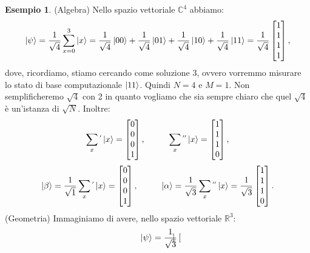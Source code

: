 \documentclass{book}
\theoremstyle{definition}
\theoremstyle{definition}
\theoremstyle{definition}
\newtheorem*{ex}{Esempio}
\theoremstyle{plain}
\theoremstyle{plain}
\theoremstyle{plain}
\theoremstyle{plain}
\begin{document}
\begin{ex}
(Algebra) Nello spazio vettoriale $\mathbb{C}^{4}$ abbiamo:
\begin{displaymath}
\ket{\psi} = \frac{1}{\sqrt{4}}\sum_{x=0}^{3}\ket{x} = \frac{1}{\sqrt{4}}\ket{00} + \frac{1}{\sqrt{4}}\ket{01} + \frac{1}{\sqrt{4}}\ket{10} + \frac{1}{\sqrt{4}}\ket{11} = \frac{1}{\sqrt{4}} \begin{bmatrix}
1 \\
1 \\
1 \\
1 
\end{bmatrix},
\end{displaymath}
dove, ricordiamo, stiamo cercando come soluzione 3, ovvero vorremmo misurare lo stato di base computazionale $\ket{11}$. Quindi $N=4$ e $M=1$. Non semplificheremo $\sqrt{4}$ con 2 in quanto vogliamo che sia sempre chiaro che quel $\sqrt{4}$ è un'istanza di $\sqrt{N}$. Inoltre:
\begin{displaymath}
\sum_{x}\mathop{}^{'}\ket{x} = \begin{bmatrix}
0 \\
0 \\
0 \\
1
\end{bmatrix},
\mkern50mu \sum_{x}\mathop{}^{''}\ket{x} = \begin{bmatrix}
1 \\
1 \\
1 \\
0
\end{bmatrix},
\end{displaymath}
\begin{displaymath}
\ket{\beta} = \frac{1}{\sqrt{1}}\sum_{x}\mathop{}^{'}\ket{x} = \begin{bmatrix}
0 \\
0 \\
0 \\
1
\end{bmatrix}, \mkern50mu \ket{\alpha} = \frac{1}{\sqrt{3}}\sum_{x}\mathop{}^{''}\ket{x} = \frac{1}{\sqrt{3}} \begin{bmatrix}
1 \\
1 \\
1 \\
0
\end{bmatrix}.
\end{displaymath}
(Geometria) Immaginiamo di avere, nello spazio vettoriale $\mathbb{R}^{3}$:
\begin{displaymath}
\ket{\psi} = \frac{1}{\sqrt{3}} \begin{bmatrix}

\end{bmatrix}
\end{displaymath}
\end{ex}
\end{document}
